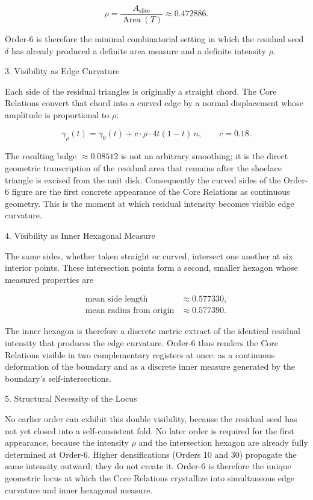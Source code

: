 \[
\rho=\frac{A_{\mathrm{slice}}}{\operatorname{Area}(T)}\approx 0.472886.
\]

Order-6 is therefore the minimal combinatorial setting in which the residual seed \(\delta\) has already produced a definite area measure and a definite intensity \(\rho\).

3. Visibility as Edge Curvature

Each side of the residual triangles is originally a straight chord. The Core Relations convert that chord into a curved edge by a normal displacement whose amplitude is proportional to \(\rho\):

\[
\gamma_\rho(t)=\gamma_0(t)+c\cdot\rho\cdot 4t(1-t)\,n,\qquad c=0.18.
\]

The resulting bulge \(\approx 0.08512\) is not an arbitrary smoothing; it is the direct geometric transcription of the residual area that remains after the shoelace triangle is excised from the unit disk. Consequently the curved sides of the Order-6 figure are the first concrete appearance of the Core Relations as continuous geometry. This is the moment at which residual intensity becomes visible edge curvature.

4. Visibility as Inner Hexagonal Measure

The same sides, whether taken straight or curved, intersect one another at six interior points. These intersection points form a second, smaller hexagon whose measured properties are

\[
\begin{align*}
\text{mean side length}&\approx 0.577330,\\
\text{mean radius from origin}&\approx 0.577390.
\end{align*}
\]

The inner hexagon is therefore a discrete metric extract of the identical residual intensity that produces the edge curvature. Order-6 thus renders the Core Relations visible in two complementary registers at once: as a continuous deformation of the boundary and as a discrete inner measure generated by the boundary’s self-intersections.

5. Structural Necessity of the Locus

No earlier order can exhibit this double visibility, because the residual seed has not yet closed into a self-consistent fold. No later order is required for the first appearance, because the intensity \(\rho\) and the intersection hexagon are already fully determined at Order-6. Higher densifications (Orders 10 and 30) propagate the same intensity outward; they do not create it. Order-6 is therefore the unique geometric locus at which the Core Relations crystallize into simultaneous edge curvature and inner hexagonal measure.

